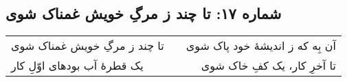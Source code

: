 \begin{center}
\section*{شماره ۱۷: تا چند ز مرگِ خویش غمناک شوی}
\label{sec:017}
\begin{longtable}{l p{0.5cm} r}
تا چند ز مرگِ خویش غمناک شوی
&&
آن بِه که ز اندیشهٔ خود پاک شوی
\\
یک قطرهٔ آب بودهای اوّلِ کار
&&
تا آخرِ کار، یک کفِ خاک شوی
\\
\end{longtable}
\end{center}
